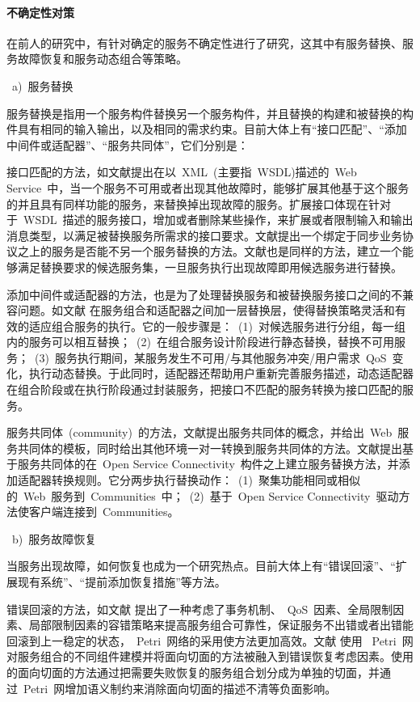 \paragraph{不确定性对策}

在前人的研究中，有针对确定的服务不确定性进行了研究，这其中有服务替换、服务故障恢复和服务动态组合等策略。

~a)~服务替换

服务替换是指用一个服务构件替换另一个服务构件，并且替换的构建和被替换的构件具有相同的输入输出，以及相同的需求约束。目前大体上有“接口匹配”、“添加中间件或适配器”、“服务共同体”，它们分别是：

接口匹配的方法，如文献\cite{ponnekanti2004interoperability}提出在以~XML~(主要指~WSDL)描述的~Web Service~中，当一个服务不可用或者出现其他故障时，能够扩展其他基于这个服务的并且具有同样功能的服务，来替换掉出现故障的服务。扩展接口体现在针对于~WSDL~描述的服务接口，增加或者删除某些操作，来扩展或者限制输入和输出消息类型，以满足被替换服务所需求的接口要求。文献\cite{benatallah2005temporal}提出一个绑定于同步业务协议之上的服务是否能不另一个服务替换的方法。文献\cite{salas2006ws}\cite{guo2007angel}也是同样的方法，建立一个能够满足替换要求的候选服务集，一旦服务执行出现故障即用候选服务进行替换。

添加中间件或适配器的方法，也是为了处理替换服务和被替换服务接口之间的不兼容问题。如文献\cite{chen2008web} 在服务组合和适配器之间加一层替换层，使得替换策略灵活和有效的适应组合服务的执行。它的一般步骤是：~(1)~对候选服务进行分组，每一组内的服务可以相互替换；~(2)~在组合服务设计阶段进行静态替换，替换不可用服务；~(3)~服务执行期间，某服务发生不可用/与其他服务冲突/用户需求~QoS~变化，执行动态替换。于此同时，适配器还帮助用户重新完善服务描述，动态适配器在组合阶段或在执行阶段通过封装服务，把接口不匹配的服务转换为接口匹配的服务。

服务共同体~(community)~的方法，文献\cite{medjahed2005dynamic}提出服务共同体的概念，并给出~Web~服务共同体的模板，同时给出其他环境一对一转换到服务共同体的方法。文献\cite{taher2006towards}提出基于服务共同体的在~Open Service Connectivity~构件之上建立服务替换方法，并添加适配器转换规则。它分两步执行替换动作：~(1)~聚集功能相同或相似的~Web~服务到~Communities~中；~(2)~基于~Open Service Connectivity~驱动方法使客户端连接到~Communities。~

~b)~服务故障恢复

当服务出现故障，如何恢复也成为一个研究热点。目前大体上有“错误回滚”、“扩展现有系统”、“提前添加恢复措施”等方法。

错误回滚的方法，如文献\cite{yu2010fault} 提出了一种考虑了事务机制、~QoS~因素、全局限制因素、局部限制因素的容错策略来提高服务组合可靠性，保证服务不出错或者出错能回滚到上一稳定的状态，~Petri~网络的采用使方法更加高效。文献\cite{fan2011approach} 使用
~Petri~网对服务组合的不同组件建模并将面向切面的方法被融入到错误恢复考虑因素。使用的面向切面的方法通过把需要失败恢复的服务组合划分成为单独的切面，并通过~Petri~网增加语义制约来消除面向切面的描述不清等负面影响。

